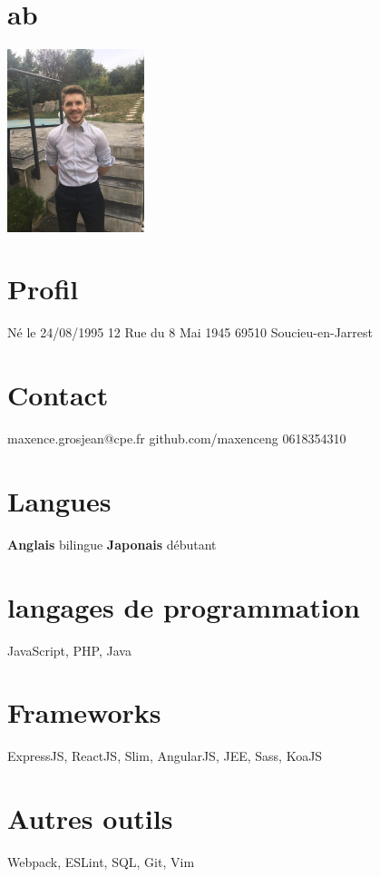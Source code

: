 \documentclass[french]{cv-style}     %
\begin{document}
\lastupdated

\begin{aside}
\section{ab}
\includegraphics[width=4cm]{photo}
%
\section{Profil}
Né le 24/08/1995
12 Rue du 8 Mai 1945
69510 Soucieu-en-Jarrest
%
\section{Contact}
maxence.grosjean@cpe.fr
github.com/maxenceng
0618354310
%
\section{Langues}
\textbf{Anglais}  bilingue
\textbf{Japonais}  débutant
%
\section{langages de programmation}
JavaScript, PHP, Java
%
\section{Frameworks}
ExpressJS, ReactJS, Slim, AngularJS, JEE, Sass, KoaJS
%
\section{Autres outils}
Webpack, ESLint, SQL, Git, Vim
%
\end{aside}
\end{document}
